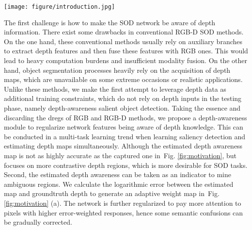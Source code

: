 \documentclass[journal]{IEEEtran}
\newcommand{\figref}[1]{Fig. \ref{#1}}
\begin{document}
\begin{figure*}[t]
	\begin{center}
\texttt{[image: figure/introduction.jpg]}
		\caption{Illustration of our Ubiquitous Target Awareness (UTA) network, consisting of three meaningful designs. (a) depth awareness: focusing on depth regions and mining ambiguous regions by the generated error weights between predicted depth and depth groundtruth.
		(b) low-level cues awareness: embedding the edge information for cross-modal fusion.
		(c) scale awareness: perceiving multi-scale contextual information for saliency detection.
		}\label{fig:motivation}
	\end{center}
\end{figure*}


The first challenge is how to make the SOD network be aware of depth information. There exist some drawbacks in conventional RGB-D SOD methods. On the one hand, these conventional methods usually rely on auxiliary branches to extract depth features and then fuse these features with RGB ones. This would lead to heavy computation burdens and insufficient modality fusion.
On the other hand, object segmentation processes heavily rely on the acquisition of depth maps, which are unavailable on some extreme occasions or realistic applications.
Unlike these methods, we make the first attempt to leverage depth data as additional training constraints, which do not rely on depth inputs in the testing phase, namely depth-awareness salient object detection. Taking the essence and discarding the dregs of RGB and RGB-D methods, we propose a depth-awareness module to regularize network features being aware of depth knowledge. This can be conducted in a multi-task learning trend when learning saliency detection and estimating depth maps simultaneously. Although the estimated depth awareness map is not as highly accurate as the captured one in~\figref{fig:motivation}, but focuses on more contrastive depth regions, which is more desirable for SOD tasks.
Second, the estimated depth awareness can be taken as an indicator to mine ambiguous regions. We calculate the logarithmic error between the estimated map and groundtruth depth to generate an adaptive weight map in~\figref{fig:motivation} (a). The network is further regularized to pay more attention to pixels with higher error-weighted responses, hence some semantic confusions can be gradually corrected.
\end{document}
